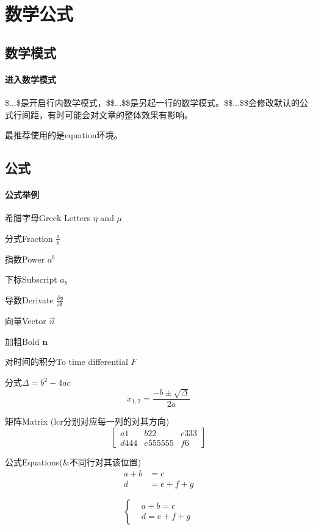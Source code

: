 \documentclass[a4paper,10 pt, conference]{article}     %
\begin{document}
\section{数学公式}

    \subsection{数学模式}
    \paragraph{进入数学模式} \$...\$是开启行内数学模式，\$\$...\$\$是另起一行的数学模式。\$\$...\$\$会修改默认的公式行间距，有时可能会对文章的整体效果有影响。

    最推荐使用的是equation环境。


    \subsection{公式}
    \paragraph{公式举例}
    希腊字母Greek Letters $\eta$ and $\mu$

    分式Fraction $\frac{a}{b}$

    指数Power $a^b$

    下标Subscript $a_b$

    导数Derivate $\frac{\partial y}{\partial t} $

   向量Vector $\vec{n}$

   加粗Bold $\mathbf{n}$

   对时间的积分To time differential $\dot{F}$

   分式$\Delta = b^2-4ac$
   \[
    x_{1,2} = \frac{-b \pm \sqrt{\Delta}}{2a}
   \]

   矩阵Matrix (lcr分别对应每一列的对其方向)
   \[
     \left[
       \begin{array}{lcr}
         a1 & b22 & c333 \\
         d444 & e555555 & f6
       \end{array}
     \right]
   \]

    公式Equations(\&不同行对其该位置)
    \begin{align}
       a+b&=c\\
       d&=e+f+g
    \end{align}

    \[
       \left\{
         \begin{aligned}
           &a+b=c\\
           &d=e+f+g
         \end{aligned}
       \right.
    \]
\end{document}
